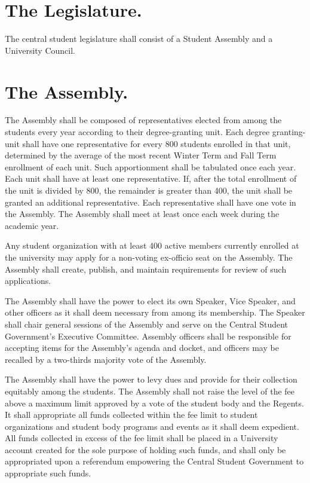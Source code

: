 \section{The Legislature.}
    The central student legislature shall consist of a Student Assembly and a University Council.

\section{The Assembly.}
    The Assembly shall be composed of representatives elected from among the students every year according to their degree-granting unit. Each degree granting-unit shall have one representative for every 800 students enrolled in that unit, determined by the average of the most recent Winter Term and Fall Term enrollment of each unit. Such apportionment shall be tabulated once each year. Each unit shall have at least one representative. If, after the total enrollment of the unit is divided by 800, the remainder is greater than 400, the unit shall be granted an additional representative. Each representative shall have one vote in the Assembly. The Assembly shall meet at least once each week during the academic year.

    Any student organization with at least 400 active members currently enrolled at the university may apply for a non-voting ex-officio seat on the Assembly. The Assembly shall create, publish, and maintain requirements for review of such applications.

    The Assembly shall have the power to elect its own Speaker, Vice Speaker, and other officers as it shall deem necessary from among its membership. The Speaker shall chair general sessions of the Assembly and serve on the Central Student Government's Executive Committee. Assembly officers shall be responsible for accepting items for the Assembly's agenda and docket, and officers may be recalled by a two-thirds majority vote of the Assembly.

     The Assembly shall have the power to levy dues and provide for their collection equitably among the students. The Assembly shall not raise the level of the fee above a maximum limit approved by a vote of the student body and the Regents. It shall appropriate all funds collected within the fee limit to student organizations and student body programs and events as it shall deem expedient. All funds collected in excess of the fee limit shall be placed in a University account created for the sole purpose of holding such funds, and shall only be appropriated upon a referendum empowering the Central Student Government to appropriate such funds.

